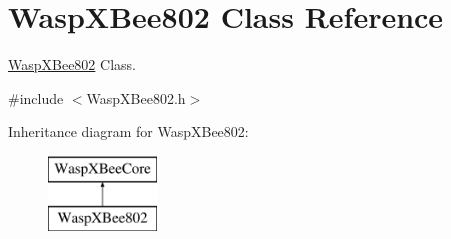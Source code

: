 \hypertarget{class_wasp_x_bee802}{}\section{Wasp\+X\+Bee802 Class Reference}
\label{class_wasp_x_bee802}


\hyperlink{class_wasp_x_bee802}{Wasp\+X\+Bee802} Class.  




{\ttfamily \#include $<$Wasp\+X\+Bee802.\+h$>$}

Inheritance diagram for Wasp\+X\+Bee802\+:\begin{figure}[H]
\begin{center}
\leavevmode
\includegraphics[height=2.000000cm]{class_wasp_x_bee802}
\end{center}
\end{figure}
